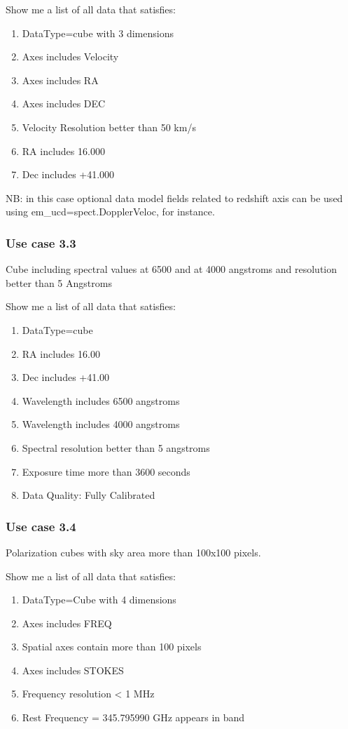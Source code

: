 \documentclass[11pt,a4paper]{ivoa}
\begin{document}
Show me a list of all data that satisfies:

\begin{enumerate}
\item DataType=cube with 3 dimensions
\item Axes includes Velocity\ \ \ \ 
\item Axes includes RA
\item Axes includes DEC
\item Velocity Resolution better than 50 km/s
\item RA includes 16.000
\item Dec includes +41.000
\end{enumerate}
NB: in this case optional data model fields related to redshift axis can be used using  em\_ucd=spect.DopplerVeloc, for
instance.

\subsubsection{Use case 3.3}
Cube including spectral values at 6500 and at 4000 angstroms and resolution better than 5 Angstroms

Show me a list of all data that satisfies:

\begin{enumerate}
\item DataType=cube
\item RA includes 16.00
\item Dec includes +41.00
\item Wavelength includes 6500 angstroms
\item Wavelength includes 4000 angstroms
\item Spectral resolution better than 5 angstroms
\item Exposure time more than 3600 seconds
\item Data Quality: Fully Calibrated
\end{enumerate}
\subsubsection{Use case 3.4}
Polarization cubes with sky area more than 100x100 pixels. 

Show me a list of all data that satisfies:

\begin{enumerate}
\item DataType=Cube with 4 dimensions
\item Axes includes FREQ
\item Spatial axes contain more than  100 pixels
\item Axes includes STOKES
\item Frequency resolution {\textless} 1 MHz
\item Rest Frequency = 345.795990 GHz appears in band
\end{enumerate}
\end{document}
